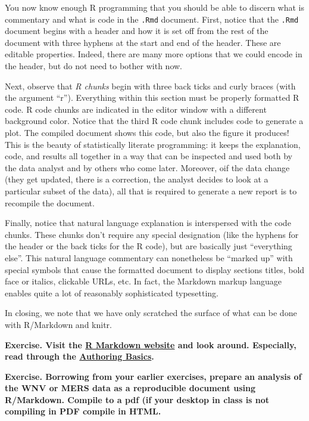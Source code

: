 \documentclass[]{article}
\begin{document}
You now know enough R programming that you should be able to discern
what is commentary and what is code in the \texttt{.Rmd} document.
First, notice that the \texttt{.Rmd} document begins with a header and
how it is set off from the rest of the document with three hyphens at
the start and end of the header. These are editable properties. Indeed,
there are many more options that we could encode in the header, but do
not need to bother with now.

Next, observe that \emph{R chunks} begin with three back ticks and curly
braces (with the argument ``r''). Everything within this section must be
properly formatted R code. R code chunks are indicated in the editor
window with a different background color. Notice that the third R code
chunk includes code to generate a plot. The compiled document shows this
code, but also the figure it produces! This is the beauty of
statistically literate programming: it keeps the explanation, code, and
results all together in a way that can be inspected and used both by the
data analyst and by others who come later. Moreover, oif the data change
(they get updated, there is a correction, the analyst decides to look at
a particular subset of the data), all that is required to generate a new
report is to recompile the document.

Finally, notice that natural language explanation is interspersed with
the code chunks. These chunks don't require any special designation
(like the hyphens for the header or the back ticks for the R code), but
are basically just ``everything else''. This natural language commentary
can nonetheless be ``marked up'' with special symbols that cause the
formatted document to display sections titles, bold face or italics,
clickable URLs, etc. In fact, the Markdown markup language enables quite
a lot of reasonably sophisticated typesetting.

In closing, we note that we have only scratched the surface of what can
be done with R/Markdown and knitr.

\textbf{Exercise. Visit the \href{http://rmarkdown.rstudio.com/}{R
Markdown website} and look around. Especially, read through the
\href{http://rmarkdown.rstudio.com/authoring_basics.html}{Authoring
Basics}.}

\textbf{Exercise. Borrowing from your earlier exercises, prepare an
analysis of the WNV or MERS data as a reproducible document using
R/Markdown. Compile to a pdf (if your desktop in class is not compiling
in PDF compile in HTML.}
\end{document}
